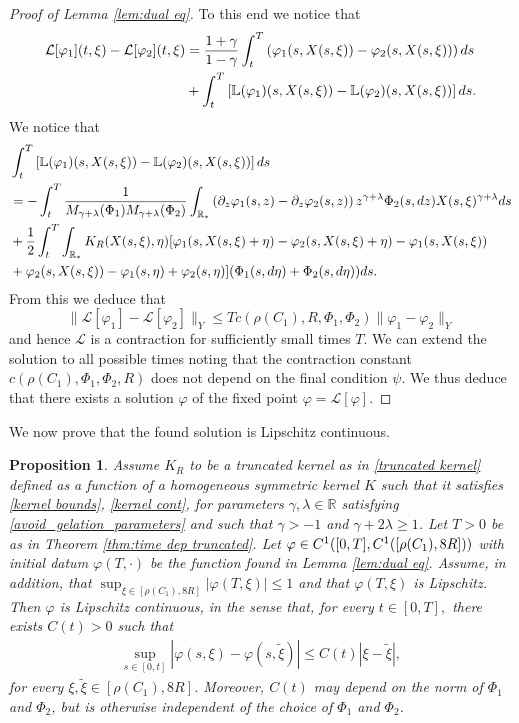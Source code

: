 \documentclass[11pt]{article}
\numberwithin{equation}{section}
\theoremstyle{plain}
\newtheorem{proposition}[theorem]{Proposition}
\newcommand{\der}{\textup{d}}
\begin{document}
\begin{proof}[Proof of Lemma \ref{lem:dual eq}]
To this end we notice that
\begin{align*}
   \mathcal L [\varphi_1] (t, \xi) -  \mathcal L [\varphi_2 ] (t, \xi) &= \frac{1+\gamma}{1-\gamma}  \int_t^T  \left( \varphi_1 (s, X(s, \xi)) -  \varphi_2 (s, X(s, \xi)) \right) \der s \\
&+\int_t^T \left[ \mathbb{L}(\varphi_1)(s, X(s , \xi)) - \mathbb{L}(\varphi_2)(s, X(s , \xi)) \right]  \der s. 
\end{align*}
We notice that 
\begin{align*} 
&\int_t^T \left[ \mathbb{L}(\varphi_1)(s, X(s , \xi)) - \mathbb{L}(\varphi_2)(s, X(s , \xi)) \right]  \der s \\
&=  -\int_t^T  \frac{1}{M_{\gamma+\lambda}(\Phi_1)  M_{\gamma+\lambda}(\Phi_2)  } \int_{\mathbb R_*} \left(  \partial_z \varphi_1 (s, z) - \partial_z \varphi_2 (s, z) \right)z^{\gamma+\lambda} \Phi_2(s, \der z)    X(s, \xi)^{\gamma+\lambda} \der s  \\ 
  & +  \frac{1}{2}\int_t^T\int_{\mathbb R_*} K_{R}(X(s , \xi),\eta)[\varphi_1(s,X(s , \xi)+\eta)- \varphi_2(s,X(s , \xi)+\eta) -\varphi_1(s,X(s , \xi))\\
  &+\varphi_2(s,X(s , \xi)) -\varphi_1(s,\eta) + \varphi_2(s,\eta) ] (\Phi_{1}(s, \der \eta)+\Phi_{2}(s, \der \eta))\der s. 
\end{align*} 
From this we deduce that 
\[
\| \mathcal L [ \varphi_1] - \mathcal L [\varphi_2]  \|_Y \leq T c(\rho(C_{1}), R, \Phi_1, \Phi_2) \| \varphi_1 - \varphi_2 \|_Y
\] 
and hence $\mathcal L $ is a contraction for sufficiently small times $T.$
We can extend the solution to all possible times noting that the contraction constant $c(\rho(C_{1}),  \Phi_1, \Phi_2, R)$ does not depend on the final condition $\psi$. 
We thus deduce that there exists a solution $\varphi$ of the fixed point $\varphi= \mathcal L [\varphi].$
\end{proof}
We now prove that the found solution is Lipschitz continuous.
\begin{proposition}\label{dual function lipschitz}
Assume $K_R$ to be a truncated kernel as in \eqref{truncated kernel} defined as a function of a homogeneous symmetric kernel $K$ such that it satisfies \eqref{kernel bounds},  \eqref{kernel cont},  for parameters $\gamma , \lambda \in \mathbb R $ satisfying \eqref{avoid_gelation_parameters} and such that $\gamma > -1$ and $\gamma + 2 \lambda \geq 1 $. Let $T>0$ be as in Theorem \ref{thm:time dep truncated}. Let $\varphi\in \textup{C}^{1}([0,T],\textup{C}^{1}([\rho(C_1),8R]))$ with initial datum $\varphi(T,\cdot)$ be the function found in Lemma \ref{lem:dual eq}. Assume, in addition, that $\sup_{ \xi\in[\rho(C_1),8R]}|\varphi(T,\xi)|\leq 1$ and that $\varphi(T,\xi)$ is Lipschitz. Then $\varphi$ is Lipschitz continuous, in the sense that, for every $t\in[0,T],$ there exists $C(t)>0$ such that 
\begin{align*}
    \sup_{s\in[0,t]}|\varphi(s,\xi)-\varphi(s,\tilde{\xi})|\leq C(t)|\xi-\tilde{\xi}|,
\end{align*}
for every $\xi,\tilde{\xi}\in[\rho(C_1),8R]$. Moreover, $C(t)$ may depend on the norm of $\Phi_{1}$ and $\Phi_{2}$, but is otherwise independent of the choice of $\Phi_{1}$ and $\Phi_{2}$.
\end{proposition}
\end{document}
